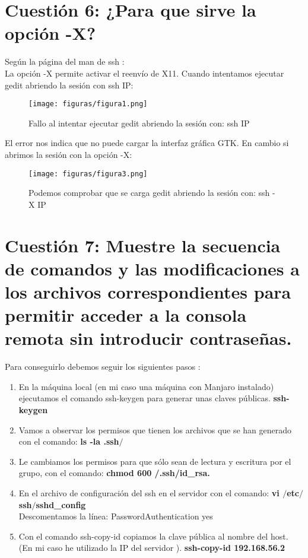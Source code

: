 \section{Cuestión 6: ¿Para que sirve la opción -X?}
Según la página del man de ssh \cite{-X}:\\
La opción -X permite activar el reenvío de X11.
Cuando intentamos ejecutar gedit abriendo la sesión con ssh IP: 
\begin{figure}[H] %
	\centering
	\texttt{[image: figuras/figura1.png]}  %
	\label{figura1}
	
	\caption{Fallo al intentar ejecutar gedit abriendo la sesión con: ssh IP} 
\end{figure}
El error nos indica que no puede cargar la interfaz gráfica GTK.
En cambio si abrimos la sesión con la opción -X:
\begin{figure}[H] %
	\centering
	\texttt{[image: figuras/figura3.png]}  %
	\label{figura3}
	
	\caption{Podemos comprobar que se carga gedit abriendo la sesión con: ssh -X IP} 
\end{figure}


\section{Cuestión 7: Muestre la secuencia de comandos y las modificaciones a los archivos correspondientes para permitir acceder a la consola remota sin introducir contraseñas.}
Para conseguirlo debemos seguir los siguientes pasos \cite{ssh-keygen} \cite{ssh-copy-id} \cite{tuto}:
\begin{enumerate}
	\item En la máquina local (en mi caso una máquina con Manjaro \cite{manjaro} instalado) ejecutamos el comando ssh-keygen para generar unas claves públicas.
		\textbf{ssh-keygen}
	\item Vamos a observar los permisos que tienen los archivos que se han generado con el comando:	
		\textbf{ls -la .ssh$/$}
	\item Le cambiamos los permisos para que sólo sean de lectura y escritura por el grupo, con el comando:
		\textbf{chmod 600 /.ssh/id\_rsa.}
	\item En el archivo de configuración del ssh en el servidor con el comando: 
		\textbf{vi $/$etc$/$ssh$/$sshd\_config}\\
		Descomentamos la línea: PasswordAuthentication yes
	\item Con el comando ssh-copy-id copiamos la clave pública al nombre del host. (En mi caso he utilizado la IP del servidor ).
		\textbf{ssh-copy-id  192.168.56.2}
\end{enumerate}

